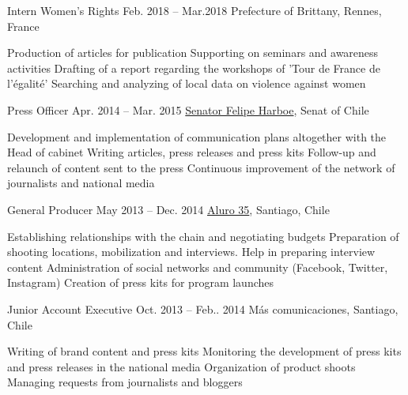 \begin{joblist}


\item[Intern Women's Rights ]{Feb. 2018 -- Mar.2018 }     
  	{Prefecture of Brittany, Rennes, France}     
  	{
		\iftbftiny \setlength{\parskip}{-10pt} \fi
		\begin{itemize}
			  \iftbftiny \setlength\itemsep{-3pt} \fi
			  \cvitem[\checkmark] Production of articles for publication
			  \cvitem[\checkmark] Supporting on seminars and awareness activities
			  \cvitem[\checkmark] Drafting of a report regarding the workshops of 'Tour de France de l'égalité'
			  \cvitem[\checkmark] Searching and analyzing of local data on violence against women
		\end{itemize}       
	}


\item[Press Officer]{Apr. 2014 -- Mar. 2015}
     { \href{https://www.harboe.cl/}{Senator Felipe Harboe}, Senat of Chile } 
	 {
			\iftbftiny \setlength{\parskip}{-10pt} \fi
			\begin{itemize}
			  \iftbftiny \setlength\itemsep{-3pt} \fi
			  \cvitem[\checkmark] Development and implementation of communication plans altogether with the Head of cabinet
			  \cvitem[\checkmark] Writing articles, press releases and press kits
			  \cvitem[\checkmark] Follow-up and relaunch of content sent to the press
			  \cvitem[\checkmark] Continuous improvement of the network of journalists and national media
			\end{itemize}     
	}
    
    
    
\item[General Producer]{May 2013 -- Dec. 2014}
     {\href{https://www.aluro35.com/}  {Aluro 35}, Santiago, Chile}
     {	
			\iftbftiny \setlength{\parskip}{-10pt} \fi
			\begin{itemize}
			  \iftbftiny \setlength\itemsep{-3pt} \fi
			  \cvitem[\checkmark] Establishing relationships with the chain and negotiating budgets
			  \cvitem[\checkmark] Preparation of shooting locations, mobilization and interviews. Help in preparing interview content
			  \cvitem[\checkmark] Administration of social networks and community (Facebook, Twitter, Instagram)
			  \cvitem[\checkmark] Creation of press kits for program launches
			\end{itemize}     
	}



\item[Junior Account Executive ]{Oct. 2013 -- Feb.. 2014 }     
  	{Más comunicaciones, Santiago, Chile}     
  	{
		\iftbftiny \setlength{\parskip}{-10pt} \fi
		\begin{itemize}
			  \iftbftiny \setlength\itemsep{-3pt} \fi
			  \cvitem[\checkmark] Writing of brand content and press kits
			  \cvitem[\checkmark] Monitoring the development of press kits and press releases in the national media
			  \cvitem[\checkmark] Organization of product shoots
			  \cvitem[\checkmark] Managing requests from journalists and bloggers
		\end{itemize}       
	}





\end{joblist}
